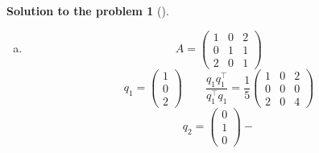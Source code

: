 \documentclass[12pt,a4]{article}
\newtheorem{solution}{Solution to the problem}
\begin{document}
\begin{solution}[]
\begin{enumerate}[(a)]
\[\qquad
\hat q_2 = \begin{pmatrix} - 1/\sqrt 3 \\ 1/\sqrt 3 \\ 1/\sqrt 3 \end{pmatrix}
\qquad
Q =
\begin{pmatrix}
1/\sqrt 2 &  - 1/\sqrt 3 \\
0  & 1/\sqrt 3 \\
1/\sqrt 2 & 1/\sqrt 3
\end{pmatrix}
\]
\[
R =
\begin{pmatrix}
\hat q_1^\top a_1 & \hat q_1^\top a_2 \\
0 & \hat q_2^\top a_2 \\
\end{pmatrix}
=
\begin{pmatrix}
2/\sqrt 2 & 6/\sqrt 2 \\
0 & 3/\sqrt 3 \\
\end{pmatrix}
\]
\[
\Rightarrow A = 
\begin{pmatrix}
1 & 2 \\
0 & 1 \\
1 & 4 \end{pmatrix}
=
\begin{pmatrix}
1/\sqrt 2 &  - 1/\sqrt 3 \\
0  & 1/\sqrt 3 \\
1/\sqrt 2 & 1/\sqrt 3
\end{pmatrix}
\begin{pmatrix}
\sqrt 2 & 3\sqrt 2 \\
0 & \sqrt 3 \\
\end{pmatrix}
\]
\item
\[
A =
\begin{pmatrix}
1 & 0 & 2 \\
0 & 1 & 1 \\
2 & 0 & 1
\end{pmatrix}
\]
\[
q_1 = \begin{pmatrix} 1 \\ 0 \\ 2  \end{pmatrix}
\qquad
\frac{q_1 q_1^\top}{q_1^\top q_1} =
\frac{1}{5}
\begin{pmatrix} 1 & 0 & 2 \\ 0 & 0 & 0 \\ 2 & 0 & 4 \end{pmatrix}
\]
\[
q_2 = \begin{pmatrix} 0 \\ 1 \\ 0  \end{pmatrix} -
\]
\end{enumerate}
\end{solution}
\end{document}
